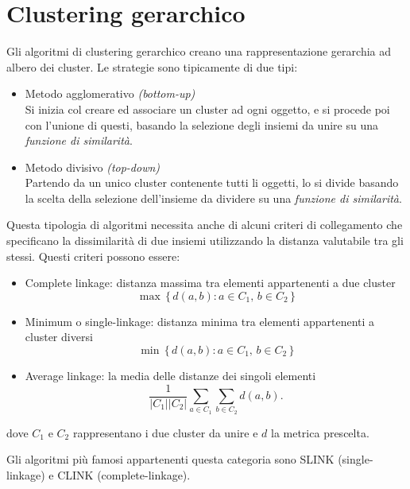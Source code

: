 \section{Clustering gerarchico}
	Gli algoritmi di clustering gerarchico creano una rappresentazione gerarchia ad albero dei cluster.
	Le strategie sono tipicamente di due tipi: 
	\begin{itemize}
		\item Metodo agglomerativo \emph{(bottom-up)} \\
		Si inizia col creare ed associare un cluster ad ogni oggetto, e si procede poi con l'unione di questi, basando la selezione degli insiemi da unire su una \emph{funzione di similarità}.

		\item Metodo divisivo \emph{(top-down)} \\
		Partendo da un unico cluster contenente tutti li oggetti, lo si divide basando la scelta della selezione dell’insieme da dividere su una \emph{funzione di similarità}.
	\end{itemize}

	Questa tipologia di algoritmi necessita anche di alcuni criteri di collegamento che specificano la dissimilarità di due insiemi utilizzando la distanza valutabile tra gli stessi. Questi criteri possono essere: 
	\begin{itemize}
		\item Complete linkage: distanza massima tra elementi appartenenti a due cluster
			\begin{equation*}
				\max \, \{\, d(a,b) : a \in C_1,\, b \in C_2 \,\}
			\end{equation*}
		\item Minimum o single-linkage: distanza minima tra elementi appartenenti a cluster diversi
			\begin{equation*}
			 	\min \, \{\, d(a,b) : a \in C_1,\, b \in C_2 \,\}
			\end{equation*}

		\item Average linkage: la media delle distanze dei singoli elementi
			\begin{equation*}
				\frac{1}{|C_1| |C_2|} \sum_{a \in C_1 }\sum_{ b \in C_2} d(a,b). 
			\end{equation*}
	\end{itemize}
	dove $C_1$ e $C_2$ rappresentano i due cluster da unire e $d$ la metrica prescelta.

	Gli algoritmi più famosi appartenenti questa categoria sono SLINK (single-linkage) e CLINK (complete-linkage)\cite{clustering_gerarchico}.
